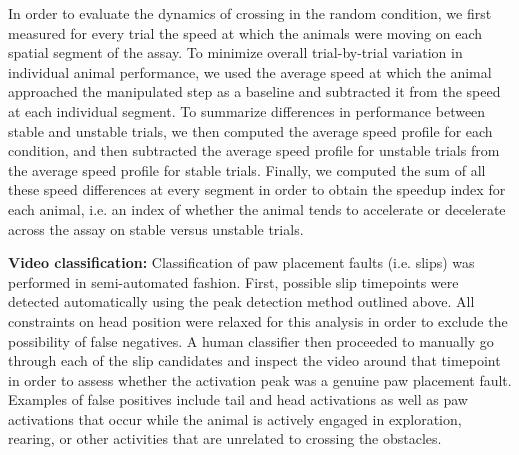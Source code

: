 In order to evaluate the dynamics of crossing in the random condition, we first measured for every trial the speed at which the animals were moving on each spatial segment of the assay. To minimize overall trial-by-trial variation in individual animal performance, we used the average speed at which the animal approached the manipulated step as a baseline and subtracted it from the speed at each individual segment. To summarize differences in performance between stable and unstable trials, we then computed the average speed profile for each condition, and then subtracted the average speed profile for unstable trials from the average speed profile for stable trials. Finally, we computed the sum of all these speed differences at every segment in order to obtain the speedup index for each animal, i.e. an index of whether the animal tends to accelerate or decelerate across the assay on stable versus unstable trials.

\textbf{Video classification:} Classification of paw placement faults (i.e. slips) was performed in semi-automated fashion. First, possible slip timepoints were detected automatically using the peak detection method outlined above. All constraints on head position were relaxed for this analysis in order to exclude the possibility of false negatives. A human classifier then proceeded to manually go through each of the slip candidates and inspect the video around that timepoint in order to assess whether the activation peak was a genuine paw placement fault. Examples of false positives include tail and head activations as well as paw activations that occur while the animal is actively engaged in exploration, rearing, or other activities that are unrelated to crossing the obstacles.

